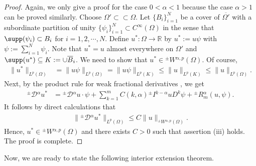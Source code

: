 \documentclass[leqno,final]{siamltex}
\numberwithin{equation}{section}
\renewcommand{\(}{\bigl(}
\renewcommand{\)}{\bigr)}
\newcommand{\R}{\mathbb{R}}
\begin{document}
    \begin{proof}
    	Again, we only give a proof for the case $0<\alpha<1$ because the case $\alpha>1$ can be proved similarly.
        Choose $\Omega' \subset \subset \Omega$. Let $\{B_{i}\}_{i=1}^{N}$ be a cover of $\overline{\Omega'}$ 
        with a subordinate partition of unity $\{ \psi_{i}\}_{i=1}^{N} \subset C^{\infty}(\Omega)$ in the sense that $\supp(\psi_i)\subset B_i$ for $i=1,2,\cdots, N$. Define 
        $u^*:\Omega \rightarrow \R$ by $u^* := u \psi$ with $\psi:= \sum_{i=1}^{N} \psi_{i}$. 
        Note that $u^* = u$ almost 
        everywhere on $\Omega'$ and $\supp(u^*) \subseteq K:=\cup \overline{B}_i$. We need to show 
        that $u^* \in {^{\pm}}{W}{^{\alpha,p}}(\Omega)$. Of course, 
        \begin{align*}
            \|u^*\|_{L^{p}(\Omega)} &= \bigl\| u \psi  \bigr\|_{L^{p}(\Omega)} 
            = \bigl\| u \psi \bigr\|_{L^p(K)} \leq \| u \|_{L^{p}(K)} \leq \|u\|_{L^{p}(\Omega)}.
        \end{align*}
        Next, by the product rule for weak fractional derivatives \cite[Theorem 4.3]{Feng_Sutton}, 
        we get 
        \begin{align*}
            {^{\pm}}{\mathcal{D}}{^{\alpha}} u^* &= {^{\pm}}{\mathcal{D}}{^{\alpha}} u \cdot 
           \psi + \sum_{k=1}^{m} C(k,\alpha) {^{\pm}}{I}{^{k-\alpha}} u  D^{k} \psi  + {^{\pm}}{R}{^{\alpha}_{m}} (u,\psi).
        \end{align*}
        It follows by direct calculations that 
        \begin{align*}
            \|{^{\pm}}{\mathcal{D}}{^{\alpha}} u^*\|_{L^{p}(\Omega)} \leq C \|u\|_{{^{\pm}}{W}{^{\alpha,p}}(\Omega)}.
        \end{align*}
        Hence, $u^* \in {^{\pm}}{W}{^{\alpha,p}}(\Omega)$ and there exists $C >0$ 
        such that assertion (iii) holds. The proof is complete. 
    \end{proof}

Now, we are ready to state the following interior extension theorem. 
\end{document}
